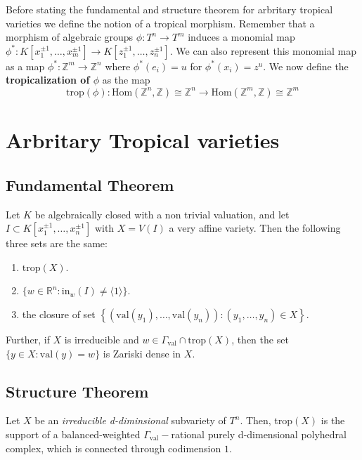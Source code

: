     Before stating the fundamental and structure theorem for arbritary tropical varieties we define the notion of a tropical morphism.
    Remember that a morphism of algebraic groups $\phi : T^{n}\to T^{m}$ induces a monomial map $\phi^{*}:K[x_1^{\pm 1}, \dots, x_m^{\pm 1}]\to K[z_1^{\pm 1}, \dots, z_n^{\pm 1}]$. 
    We can also represent this monomial map as a map $\phi^{*}: \mathbb{Z}^{m}\to \mathbb{Z}^{n}$ where $\phi^{*}(e_i) = u$ for $\phi^{*}(x_i) = z^u$. We now define the \textbf{tropicalization of $\phi$} as the map
    \begin{equation*}
        \text{trop}(\phi): \text{Hom}(\mathbb{Z}^{n},\mathbb{Z})\cong \mathbb{Z}^{n} \to \text{Hom}(\mathbb{Z}^{m},\mathbb{Z})\cong \mathbb{Z}^{m}
    \end{equation*}


\section{Arbritary Tropical varieties}
\subsection{Fundamental Theorem}

    \begin{theorem}
        Let $K$ be algebraically closed with a non trivial valuation, and let $I \subset K[x_1^{\pm 1}, \dots, x_n^{\pm 1}]$ with $X = V(I)$ a very affine variety. 
        Then the following three sets are the same:
        \begin{enumerate}
            \item $\text{trop}(X)$.
            \item $\{w \in \mathbb{R}^{n}: \text{in}_{w}(I) \neq \langle 1\rangle\}$. 
            \item the closure of set $\left\{(\text{val}(y_1), \dots, \text{val}(y_n)): (y_1,\dots, y_n) \in X\right\}$.
        \end{enumerate}
        Further, if $X$ is irreducible and $w \in \Gamma_{\text{val}} \cap \text{trop}(X)$, then the set $\{y \in X: \text{val}(y) = w\}$ is Zariski dense in $X$.
    \end{theorem}
\subsection{Structure Theorem}
    \begin{theorem}
        Let $X$ be an \textit{irreducible d-diminsional} subvariety of $T^{n}$. Then, trop$(X)$ is the support of a balanced-weighted $\Gamma_{\text{val}}-$rational purely d-dimensional polyhedral complex, which is connected through codimension $1$.
    \end{theorem}
